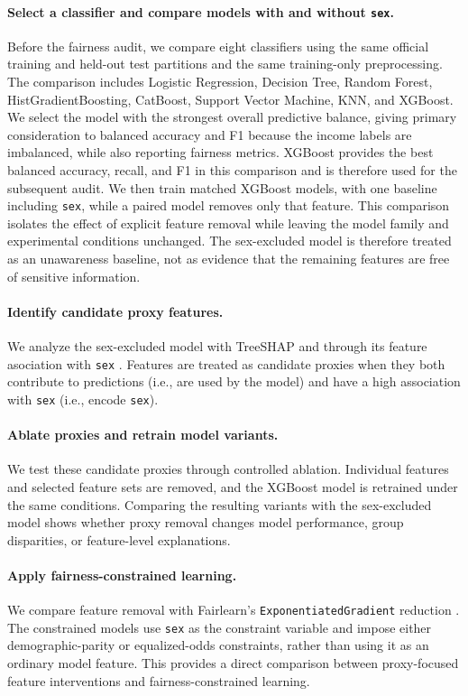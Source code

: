 \documentclass{article}
\begin{document}
\paragraph{Select a classifier and compare models with and without \texttt{sex}.}
Before the fairness audit, we compare eight classifiers using the
same official training and held-out test partitions and the same
training-only preprocessing. The comparison includes Logistic Regression,
Decision Tree, Random Forest, HistGradientBoosting, CatBoost, Support Vector
Machine, KNN, and XGBoost. We select the model with the strongest overall
predictive balance, giving primary consideration to balanced accuracy and F1
because the income labels are imbalanced, while also reporting fairness
metrics. XGBoost provides the best balanced accuracy, recall, and F1 in this
comparison and is therefore used for the subsequent audit. We then train
matched XGBoost models, with one baseline including \texttt{sex}, while a
paired model removes only that feature. This comparison isolates the effect of
explicit feature removal while leaving the model family and experimental
conditions unchanged. The sex-excluded model is therefore treated as an
unawareness baseline, not as evidence that the remaining features are free of
sensitive information.

\paragraph{Identify candidate proxy features.}
We analyze the sex-excluded model with TreeSHAP and through its feature asociation with \texttt{sex}
\citep{lundberg2017unified}. Features are treated as candidate proxies when
they both contribute to predictions (i.e., are used by the model) and 
have a high association with \texttt{sex} (i.e., encode \texttt{sex}). 

\paragraph{Ablate proxies and retrain model variants.}
We test these candidate proxies through controlled ablation. Individual
features and selected feature sets are removed, and the XGBoost model is
retrained under the same conditions. Comparing the resulting variants with
the sex-excluded model shows whether proxy removal changes model performance,
group disparities, or feature-level explanations.

\paragraph{Apply fairness-constrained learning.}
We compare feature removal with Fairlearn's
\texttt{ExponentiatedGradient} reduction
\citep{agarwal2018reductions}. The constrained models use \texttt{sex} as the
constraint variable and impose either demographic-parity or equalized-odds
constraints, rather than using it as an ordinary model feature. This provides
a direct comparison between proxy-focused feature interventions and
fairness-constrained learning.
\end{document}
